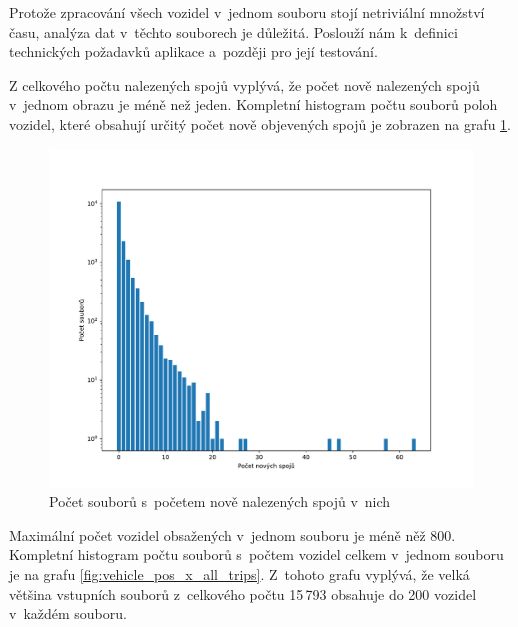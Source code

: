 Protože zpracování všech vozidel v~jednom souboru stojí netriviální množství času, analýza dat v~těchto souborech je důležitá. Poslouží nám k~definici technických požadavků aplikace a~později pro její testování.

\bigbreak

Z celkového počtu nalezených spojů vyplývá, že počet nově nalezených spojů v~jednom obrazu je méně než jeden. Kompletní histogram počtu souborů poloh vozidel, které obsahují určitý počet nově objevených spojů je zobrazen na grafu \ref{fig:vehicle_pos_x_new_trips}.

\begin{figure}
	\centering
  \includegraphics[width=\linewidth]{../img/new_trips}
  \caption{Počet souborů s~početem nově nalezených spojů v~nich}
  \label{fig:vehicle_pos_x_new_trips}
\end{figure}

\bigbreak

Maximální počet vozidel obsažených v~jednom souboru je méně něž 800. Kompletní histogram počtu souborů s~počtem vozidel celkem v~jednom souboru je na grafu \ref{fig:vehicle_pos_x_all_trips}. Z~tohoto grafu vyplývá, že velká většina vstupních souborů z~celkového počtu 15\,793 obsahuje do 200 vozidel v~každém souboru.

